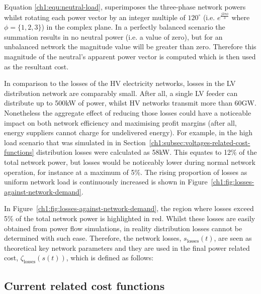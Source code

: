 

Equation \ref{ch1:equ:neutral-load}, superimposes the three-phase network powers whilst rotating each power vector by an integer multiple of $120^\circ$ (i.e. $e^\frac{j2\pi \phi}{3}$ where $\phi = \{1, 2, 3\}$) in the complex plane.
In a perfectly balanced scenario the summation results in no neutral power (i.e. a value of zero), but for an unbalanced network the magnitude value will be greater than zero.
Therefore this magnitude of the neutral's apparent power vector is computed which is then used as the resultant cost.

In comparison to the losses of the HV electricity networks, losses in the LV distribution network are comparably small.
After all, a single LV feeder can distribute up to 500kW of power, whilst HV networks transmit more than 60GW.
Nonetheless the aggregate effect of reducing those losses could have a noticeable impact on both network efficiency and maximising profit margins (after all, energy suppliers cannot charge for undelivered energy).
For example, in the high load scenario that was simulated in in Section~\ref{ch1:subsec:voltages-related-cost-functions} distribution losses were calculated as 58kW.
This equates to 12\% of the total network power, but losses would be noticeably lower during normal network operation, for instance at a maximum of 5\%.
The rising proportion of losses as uniform network load is continuously increased is shown in Figure~\ref{ch1:fig:losses-against-network-demand}.




In Figure~\ref{ch1:fig:losses-against-network-demand}, the region where losses exceed 5\% of the total network power is highlighted in red.
Whilst these losses are easily obtained from power flow simulations, in reality distribution losses cannot be determined with such ease.
Therefore, the network losses, $s_\text{losses}(t)$, are seen as theoretical key network parameters and they are used in the final power related cost, $\zeta_\text{losses}(s(t))$, which is defined as follows:



\subsection{Current related cost functions}
\label{ch1:subsec:currents-related-cost-functions}

